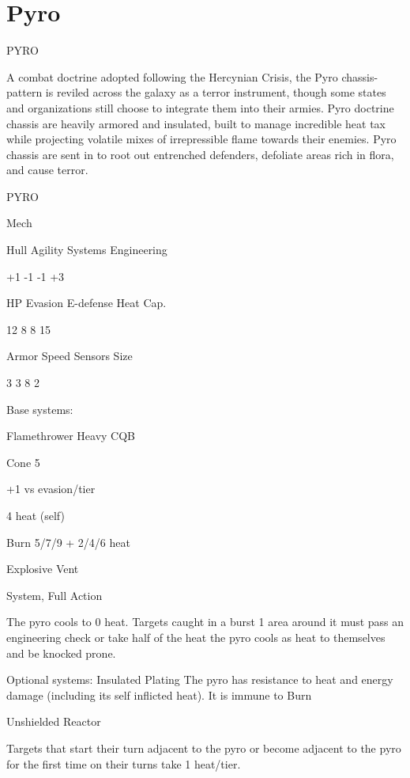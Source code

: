 \section{Pyro}

                                                   PYRO

A combat doctrine adopted following the Hercynian Crisis, the Pyro chassis-pattern is reviled
across the galaxy as a terror instrument, though some states and organizations still choose to
integrate them into their armies. Pyro doctrine chassis are heavily armored and insulated, built to
manage incredible heat tax while projecting volatile mixes of irrepressible flame towards their
enemies. Pyro chassis are sent in to root out entrenched defenders, defoliate areas rich in flora,
and cause terror.


 PYRO

 Mech

 Hull       Agility      Systems       Engineering

 +1         -1           -1            +3

 HP         Evasion      E-defense     Heat Cap.

 12         8            8             15

 Armor      Speed        Sensors       Size

 3          3            8             2

Base systems:

Flamethrower
Heavy CQB

Cone 5

+1 vs evasion/tier

4 heat (self)

Burn 5/7/9 + 2/4/6 heat


Explosive Vent

System, Full Action

The pyro cools to 0 heat. Targets caught in a burst 1 area around it must pass an engineering
check or take half of the heat the pyro cools as heat to themselves and be knocked prone.


Optional systems:
Insulated Plating
The pyro has resistance to heat and energy damage (including its self inflicted heat). It is immune
to Burn


Unshielded Reactor




Targets that start their turn adjacent to the pyro or become adjacent to the pyro for the first time
on their turns take 1 heat/tier.


